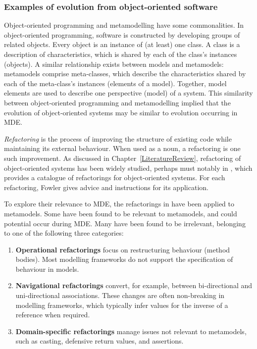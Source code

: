 \subsubsection{Examples of evolution from object-oriented software}
Object-oriented programming and metamodelling have some commonalities. In object-oriented programming, software is constructed by developing groups of related objects. Every object is an instance of (at least) one class. A class is a description of characteristics, which is shared by each of the class's instances (objects). A similar relationship exists between models and metamodels: metamodels comprise meta-classes, which describe the characteristics shared by each of the meta-class's instances (elements of a model). Together, model elements are used to describe one perspective (model) of a system. This similarity between object-oriented programming and metamodelling implied that the evolution of object-oriented systems may be similar to evolution occurring in MDE. 

\emph{Refactoring} is the process of improving the structure of existing code while maintaining its external behaviour. When used as a noun, a refactoring is one such improvement. As discussed in Chapter~\ref{LiteratureReview}, refactoring of object-oriented systems has been widely studied, perhaps must notably in \cite{fowler99refactoring}, which provides a catalogue of refactorings for object-oriented systems. For each refactoring, Fowler gives advice and instructions for its application.

To explore their relevance to MDE, the refactorings in \cite{fowler99refactoring} have been applied to metamodels. Some have been found to be relevant to metamodels, and could potential occur during MDE. Many have been found to be irrelevant, belonging to one of the following three categories:

\begin{enumerate}
	\item \textbf{Operational refactorings} focus on restructuring behaviour (method bodies). Most modelling frameworks do not support the specification of behaviour in models.
	\item \textbf{Navigational refactorings} convert, for example, between bi-directional and uni-directional associations. These changes are often non-breaking in modelling frameworks, which typically infer values for the inverse of a reference when required.
	\item \textbf{Domain-specific refactorings} manage issues not relevant to metamodels, such as casting, defensive return values, and assertions.
\end{enumerate}

